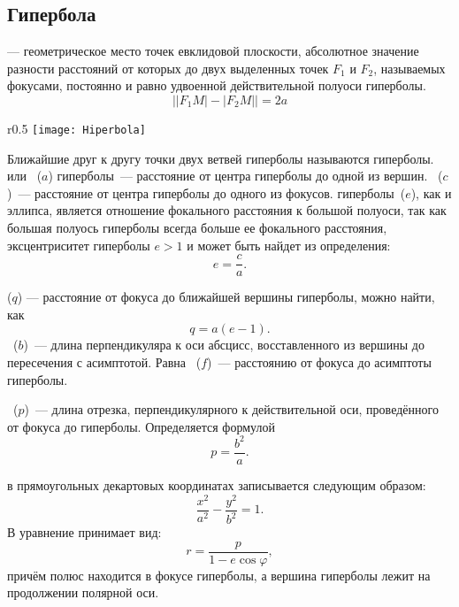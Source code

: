 \subsection{Гипербола}
 
{\bfseries {}} --- геометрическое место точек евклидовой плоскости, абсолютное значение разности расстояний от которых до двух выделенных точек $F_1$ и $F_2$, называемых фокусами, постоянно и равно удвоенной действительной полуоси гиперболы.
\begin{equation}
\bigl||F_1M|-|F_2M|\bigr| = 2a
\end{equation}

\begin{wrapfigure}[14]{r}{0.5\tw}
	\vspace{-1pc}
	\texttt{[image: Hiperbola]}
\end{wrapfigure}
Ближайшие друг к другу точки двух ветвей гиперболы называются  гиперболы.  или ~($a$) гиперболы~--- расстояние от центра гиперболы до одной из вершин. ~($c$)~---  расстояние от центра гиперболы до одного из фокусов.  гиперболы~($e$), как и  эллипса, является отношение фокального расстояния к большой полуоси, так как большая полуось гиперболы всегда больше ее фокального расстояния, эксцентриситет гиперболы $e > 1$ и может быть найдет из определения:
\begin{equation}
e=\frac{c}{a}.
\end{equation}

 ($q$) --- расстояние от фокуса до ближайшей вершины гиперболы, можно найти, как
\begin{equation}
q = a ( e - 1).
\end{equation}
~($b$)~--- длина перпендикуляра к оси абсцисс, восставленного из вершины до пересечения с асимптотой. Равна ~($f$)~--- расстоянию от фокуса до асимптоты гиперболы.

~($p$)~--- длина отрезка, перпендикулярного к действительной оси, проведённого от фокуса до гиперболы. Определяется формулой
\begin{equation}
p=\frac{b^2}{a}.
\end{equation}

 в прямоугольных декартовых координатах записывается следующим образом:
\begin{equation}
\frac{x^2}{a^2}-\frac{y^2}{b^2}=1.
\end{equation}
В  уравнение принимает вид:
\begin{equation}
r=\frac{p}{1-e\cos\varphi},
\end{equation}
причём полюс находится в фокусе гиперболы, а вершина гиперболы лежит на продолжении полярной оси.

